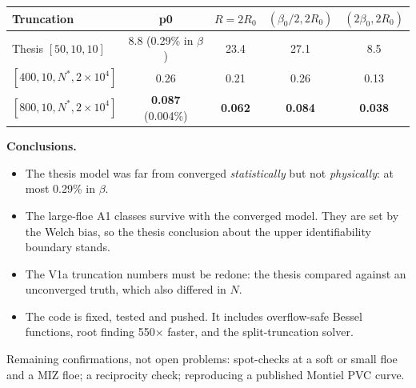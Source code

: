 \documentclass[10pt,a4paper]{article}
\begin{document}
\begin{center}\small
\begin{tabular}{@{}lcccc@{}}
\toprule
Truncation & p0 & $R=2R_0$ & $(\beta_0/2,2R_0)$ & $(2\beta_0,2R_0)$ \\
\midrule
Thesis $[50,10,10]$ & 8.8 \;(0.29\% in $\beta$) & 23.4 & 27.1 & 8.5 \\
$[400,10,N^*,2{\times}10^4]$ & 0.26 & 0.21 & 0.26 & 0.13 \\
$[800,10,N^*,2{\times}10^4]$ & \textbf{0.087} \;(0.004\%) & \textbf{0.062} & \textbf{0.084} & \textbf{0.038} \\
\bottomrule
\end{tabular}
\end{center}
\textbf{Conclusions.}
\begin{itemize}
\item The thesis model was far from converged \emph{statistically} but not \emph{physically}: at most 0.29\% in $\beta$.
\item The large-floe A1 classes survive with the converged model. They are set by the Welch bias, so the thesis conclusion about the upper identifiability boundary stands.
\item The V1a truncation numbers must be redone: the thesis compared against an unconverged truth, which also differed in $N$.
\item The code is fixed, tested and pushed. It includes overflow-safe Bessel functions, root finding 550$\times$ faster, and the split-truncation solver.
\end{itemize}
Remaining confirmations, not open problems: spot-checks at a soft or small floe and a MIZ floe; a reciprocity check; reproducing a published Montiel PVC curve.
\end{document}

